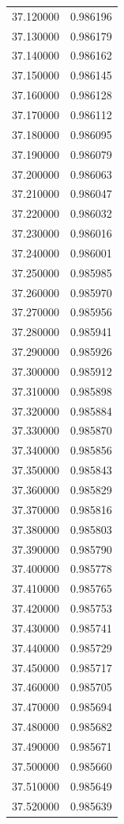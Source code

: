 \begin{tabular}{rr}
37.120000 & 0.986196 \\
37.130000 & 0.986179 \\
37.140000 & 0.986162 \\
37.150000 & 0.986145 \\
37.160000 & 0.986128 \\
37.170000 & 0.986112 \\
37.180000 & 0.986095 \\
37.190000 & 0.986079 \\
37.200000 & 0.986063 \\
37.210000 & 0.986047 \\
37.220000 & 0.986032 \\
37.230000 & 0.986016 \\
37.240000 & 0.986001 \\
37.250000 & 0.985985 \\
37.260000 & 0.985970 \\
37.270000 & 0.985956 \\
37.280000 & 0.985941 \\
37.290000 & 0.985926 \\
37.300000 & 0.985912 \\
37.310000 & 0.985898 \\
37.320000 & 0.985884 \\
37.330000 & 0.985870 \\
37.340000 & 0.985856 \\
37.350000 & 0.985843 \\
37.360000 & 0.985829 \\
37.370000 & 0.985816 \\
37.380000 & 0.985803 \\
37.390000 & 0.985790 \\
37.400000 & 0.985778 \\
37.410000 & 0.985765 \\
37.420000 & 0.985753 \\
37.430000 & 0.985741 \\
37.440000 & 0.985729 \\
37.450000 & 0.985717 \\
37.460000 & 0.985705 \\
37.470000 & 0.985694 \\
37.480000 & 0.985682 \\
37.490000 & 0.985671 \\
37.500000 & 0.985660 \\
37.510000 & 0.985649 \\
37.520000 & 0.985639 \\

\end{tabular}
